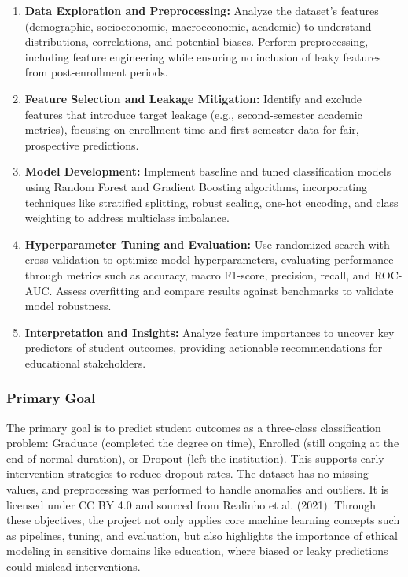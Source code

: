 \documentclass[twoside,final]{hcmut-report}
\begin{document}
\begin{enumerate}
  \item \textbf{Data Exploration and Preprocessing:} Analyze the dataset's features (demographic, socioeconomic, macroeconomic, academic) to understand distributions, correlations, and potential biases. Perform preprocessing, including feature engineering while ensuring no inclusion of leaky features from post-enrollment periods.

  \item \textbf{Feature Selection and Leakage Mitigation:} Identify and exclude features that introduce target leakage (e.g., second-semester academic metrics), focusing on enrollment-time and first-semester data for fair, prospective predictions.

  \item \textbf{Model Development:} Implement baseline and tuned classification models using Random Forest and Gradient Boosting algorithms, incorporating techniques like stratified splitting, robust scaling, one-hot encoding, and class weighting to address multiclass imbalance.

  \item \textbf{Hyperparameter Tuning and Evaluation:} Use randomized search with cross-validation to optimize model hyperparameters, evaluating performance through metrics such as accuracy, macro F1-score, precision, recall, and ROC-AUC. Assess overfitting and compare results against benchmarks to validate model robustness.

  \item \textbf{Interpretation and Insights:} Analyze feature importances to uncover key predictors of student outcomes, providing actionable recommendations for educational stakeholders.
\end{enumerate}

\subsubsection*{Primary Goal}

The primary goal is to predict student outcomes as a three-class classification problem: Graduate (completed the degree on time), Enrolled (still ongoing at the end of normal duration), or Dropout (left the institution). This supports early intervention strategies to reduce dropout rates. The dataset has no missing values, and preprocessing was performed to handle anomalies and outliers. It is licensed under CC BY 4.0 and sourced from Realinho et al. (2021). Through these objectives, the project not only applies core machine learning concepts such as pipelines, tuning, and evaluation, but also highlights the importance of ethical modeling in sensitive domains like education, where biased or leaky predictions could mislead interventions.
\end{document}
